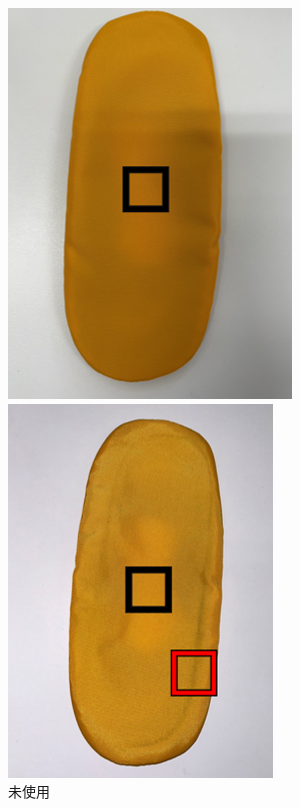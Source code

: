 \documentclass[main]{subfiles}
\begin{document}
\begin{figure}[htbp]
    \centering
    \begin{minipage}[htbp]{0.3\linewidth}
        \centering
        \includegraphics[keepaspectratio, width=0.8\linewidth, height=\linewidth]{figures/caring_brush_pad/misiyou.png}
        \caption{未使用}
        \label{fig:label}
    \end{minipage}
    \begin{minipage}[htbp]{0.3\linewidth}
        \centering
        \includegraphics[keepaspectratio, width=0.8\linewidth, height=\linewidth]{figures/caring_brush_pad/10~15A.png}

\end{minipage}
\end{figure}
\end{document}
